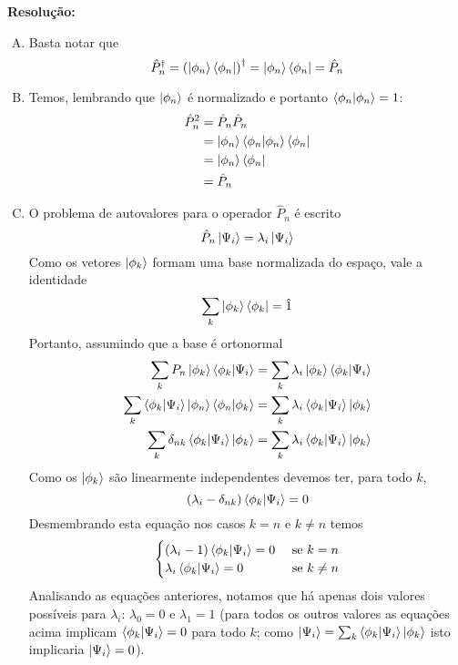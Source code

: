 \documentclass[a4paper, 12pt, notitlepage]{article}
\begin{document}
\begin{enumerate}
\textbf{Resolução: }
  \begin{enumerate}[(A)]
    \item Basta notar que
    \[ \hat{P}_n^\dagger = \left(\ket{\phi_n}\bra{\phi_n}\right)^\dagger = \ket{\phi_n}\bra{\phi_n} = \hat{P}_n \]
    \item Temos, lembrando que $\ket{\phi_n}$ é normalizado e portanto $\bra{\phi_n}\ket{\phi_n} = 1$:
    \begin{align*}
      \hat{P}_n^2 &= \hat{P}_n \hat{P}_n \\
      &= \ket{\phi_n}\bra{\phi_n}\ket{\phi_n}\bra{\phi_n} \\
      &= \ket{\phi_n}\bra{\phi_n} \\
      &= \hat{P}_n
    \end{align*}
    \item O problema de autovalores para o operador $\hat{P}_n$ é escrito
    \[ \hat{P}_n \ket{\Psi_i} = \lambda_i \ket{\Psi_i} \]
    Como os vetores $\ket{\phi_k}$ formam uma base normalizada do espaço, vale a identidade
    \[ \sum_k \ket{\phi_k}\bra{\phi_k} = \hat{1} \]
    Portanto, assumindo que a base é ortonormal
    \begin{align*}
      \sum_k P_n \ket{\phi_k}\bra{\phi_k}\ket{\Psi_i} &= \sum_k \lambda_i \ket{\phi_k}\bra{\phi_k}\ket{\Psi_i} \\
      \sum_k \bra{\phi_k}\ket{\Psi_i} \ket{\phi_n}\bra{\phi_n}\ket{\phi_k} &= \sum_k \lambda_i \bra{\phi_k}\ket{\Psi_i} \ket{\phi_k} \\
      \sum_k \delta_{nk}\bra{\phi_k}\ket{\Psi_i} \ket{\phi_k} &= \sum_k \lambda_i \bra{\phi_k}\ket{\Psi_i} \ket{\phi_k}
    \end{align*}
    Como os $\ket{\phi_k}$ são linearmente independentes devemos ter, para todo $k$,
    \[ (\lambda_i - \delta_{nk}) \bra{\phi_k}\ket{\Psi_i} = 0 \]
    Desmembrando esta equação nos casos $k = n$ e $k \neq n$ temos
    \[ \begin{cases}
    (\lambda_i - 1) \bra{\phi_k}\ket{\Psi_i} =0&\text{ se }k = n\\
    \lambda_i \bra{\phi_k}\ket{\Psi_i} =0&\text{ se }k \neq n
    \end{cases} \]
    Analisando as equações anteriores, notamos que há apenas dois valores possíveis para $\lambda_i$: $\lambda_0 = 0$ e $\lambda_1 = 1$ (para todos os outros valores as equações acima implicam $\bra{\phi_k}\ket{\Psi_i} = 0$ para todo $k$; como $\ket{\Psi_i} = \sum_k \bra{\phi_k}\ket{\Psi_i} \ket{\phi_k}$ isto implicaria $\ket{\Psi_i} = 0$).
    \begin{itemize}

\end{itemize}
\end{enumerate}
\end{enumerate}
\end{document}

